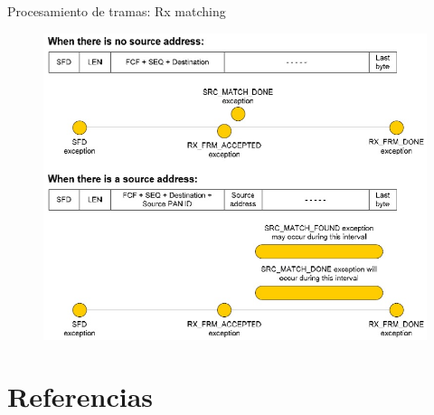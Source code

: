 \documentclass[aspectratio=169, handout]{beamer}
\begin{document}
\begin{frame}{Procesamiento de tramas: Rx matching}
	\begin{figure}[H]
		\includegraphics[height=.95\textheight]{./imagenes/matching.jpg}
	\end{figure}	
\end{frame}


\section{Referencias}
\end{document}
